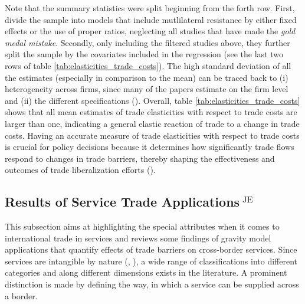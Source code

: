 Note that the summary statistics were split beginning from the forth row. First, \textcite[p. 164]{cookbook} divide the sample into models that include mutlilateral resistance by either fixed effects or the use of proper ratios, neglecting all studies that have made the \textit{gold medal mistake}. Secondly, only including the filtered studies above, they further split the sample by the covariates included in the regression (see the last two rows of table \ref{tab:elasticities_trade_costs}). The high standard deviation of all the estimates (especially in comparison to the mean) can be traced back to (i) heterogeneity across firms, since many of the papers estimate on the firm level and (ii) the different specifications (\cite[p. 164-165]{cookbook}). Overall, table \ref{tab:elasticities_trade_costs} shows that all mean estimates of trade elasticities with respect to trade costs are larger than one, indicating a general elastic reaction of trade to a change in trade costs. Having an accurate measure of trade elasticities with respect to trade costs is crucial for policy decisions because it determines how significantly trade flows respond to changes in trade barriers, thereby shaping the effectiveness and outcomes of trade liberalization efforts (\cite[p. 165]{cookbook}).





































\subsection[Results of Service Trade Applications]{Results of Service Trade Applications$^{\text{ JE}}$}
\label{sec:Service_Models}


This subsection aims at highlighting the special attributes when it comes to international trade in services and reviews some findings of gravity model applications that quantify effects of trade barriers on cross-border services. Since services are intangible by nature (\cite{intangible_2023}, \cite{eurostat2002manual}), a wide range of classifications into different categories and along different dimensions exists in the literature. A prominent distinction is made by defining the way, in which a service can be supplied across a border. 




